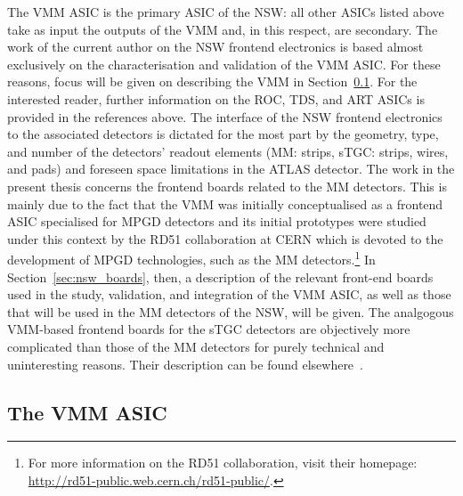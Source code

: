 The VMM ASIC is the primary ASIC of the NSW: all other ASICs listed above take as input
the outputs of the VMM and, in this respect, are secondary.
The work of the current author on the NSW frontend electronics is based almost exclusively
on the characterisation and validation of the VMM ASIC.
For these reasons, focus will be given on describing the VMM in Section~\ref{sec:vmm}.
For the interested reader, further information on the ROC, TDS, and ART ASICs is
provided in the references above.
The interface of the NSW frontend electronics to the associated detectors is dictated for the most part
by the geometry, type, and number of the detectors' readout elements (MM: strips, sTGC: strips, wires, and pads)
and foreseen space limitations in the ATLAS detector.
The work in the present thesis concerns the frontend boards related to the MM detectors.
This is mainly due to the fact that the VMM was initially conceptualised as a frontend ASIC specialised
for MPGD detectors and its initial prototypes were studied under this context by the RD51 collaboration
at CERN which is devoted to the development of MPGD technologies, such as the MM detectors.\footnote{For more information
on the RD51 collaboration, visit their homepage: \url{http://rd51-public.web.cern.ch/rd51-public/}.}
In Section~\ref{sec:nsw_boards}, then, a description of the relevant front-end boards used in the
study, validation, and integration of the VMM ASIC, as well as those that will be used in
the MM detectors of the NSW, will be given.
The analgogous VMM-based frontend boards for the sTGC detectors are objectively more complicated than those
of the MM detectors for purely technical and uninteresting reasons.
Their description can be found elsewhere~\cite{NSWTDR}.
{\color{red}{Maybe change how I describe why I am focused on MM detectors etc...}}

\subsection{The VMM ASIC}
\label{sec:vmm}

